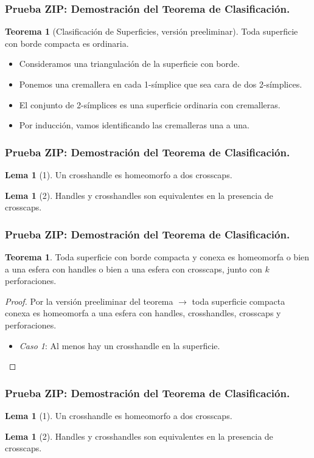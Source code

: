 \documentclass{beamer}
\theoremstyle{definition}
\newtheorem{tma}[defin]{Teorema}
\newtheorem{lema}[defin]{Lema}
\begin{document}
\begin{frame}
\frametitle{Prueba ZIP: Demostración del Teorema de Clasificación.}
\begin{tma}[Clasificación de Superficies, versión preeliminar]
Toda superficie con borde compacta es ordinaria.\pause
\end{tma}
\begin{itemize}
\item Consideramos una triangulación de la superficie con borde. 
\item Ponemos una cremallera en cada 1-símplice que sea cara de dos 2-símplices.
\item El conjunto de 2-símplices es una superficie ordinaria con cremalleras. 
\item Por inducción, vamos identificando las cremalleras una a una.
\end{itemize}
\end{frame}

\begin{frame}
\frametitle{Prueba ZIP: Demostración del Teorema de Clasificación.}
\begin{lema} [1]
Un crosshandle es homeomorfo a dos crosscaps.
\end{lema}

\begin{lema}[2]
Handles y crosshandles son equivalentes en la presencia de crosscaps.
\end{lema}
\end{frame}

\begin{frame}
\frametitle{Prueba ZIP: Demostración del Teorema de Clasificación.}
\begin{tma}
Toda superficie con borde compacta y conexa es homeomorfa o bien a una esfera con handles o bien a una esfera con crosscaps, junto con $k$ perforaciones.
\end{tma}
\begin{proof}
Por la versión preeliminar del teorema $\longrightarrow$ toda superficie compacta conexa es homeomorfa a una esfera con handles, crosshandles, crosscaps y perforaciones.\pause

\begin{itemize}
\item \textit{Caso 1}: Al menos hay un crosshandle en la superficie. 
\end{itemize}
\end{proof}
\end{frame}

\begin{frame}
\frametitle{Prueba ZIP: Demostración del Teorema de Clasificación.}
\begin{lema} [1]
Un crosshandle es homeomorfo a dos crosscaps.
\end{lema}

\begin{lema}[2]
Handles y crosshandles son equivalentes en la presencia de crosscaps.
\end{lema}
\end{frame}
\end{document}
